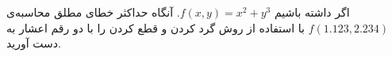 اگر داشته باشیم $f(x, y) = x^2 + y^3$. آنگاه حداکثر خطای مطلق محاسبه‌ی $f(1.123, 2.234)$ با استفاده از روش گرد کردن و قطع کردن را با دو رقم اعشار به دست آورید.

